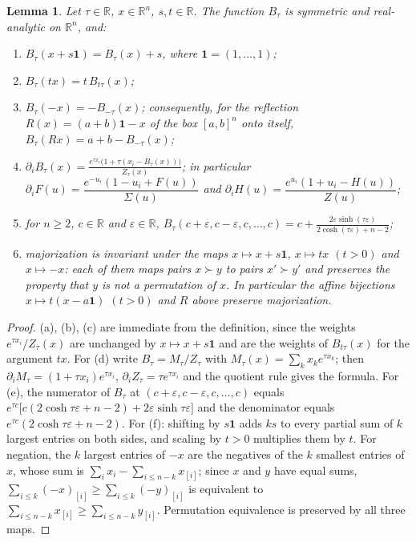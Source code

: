 \documentclass[11pt,a4paper]{article}
\theoremstyle{plain}
\newtheorem{lemma}[theorem]{Lemma}
\theoremstyle{definition}
\newcommand{\R}{\mathbb{R}}
\newcommand{\one}{\mathbf{1}}
\newcommand{\maj}{\succ}
\begin{document}
\begin{lemma}\label{lem:basic}
Let $\tau\in\R$, $x\in\R^n$, $s,t\in\R$. The function $B_\tau$ is symmetric and real-analytic on $\R^n$, and:
\begin{enumerate}
\item[(a)] $B_\tau(x+s\one)=B_\tau(x)+s$, where $\one=(1,\dots,1)$;
\item[(b)] $B_\tau(tx)=t\,B_{t\tau}(x)$;
\item[(c)] $B_\tau(-x)=-B_{-\tau}(x)$; consequently, for the reflection $R(x)=(a+b)\one-x$ of the box $[a,b]^n$ onto itself, $B_\tau(Rx)=a+b-B_{-\tau}(x)$;
\item[(d)] $\displaystyle \partial_i B_\tau(x)=\frac{e^{\tau x_i}\bigl(1+\tau(x_i-B_\tau(x))\bigr)}{Z_\tau(x)}$; in particular $\partial_i F(u)=\dfrac{e^{-u_i}(1-u_i+F(u))}{\Sigma(u)}$ and $\partial_i H(u)=\dfrac{e^{u_i}(1+u_i-H(u))}{Z(u)}$;
\item[(e)] for $n\ge 2$, $c\in\R$ and $\varepsilon\in\R$,
$\displaystyle B_\tau(c+\varepsilon,c-\varepsilon,c,\dots,c)=c+\frac{2\varepsilon\sinh(\tau\varepsilon)}{2\cosh(\tau\varepsilon)+n-2}$;
\item[(f)] majorization is invariant under the maps $x\mapsto x+s\one$, $x\mapsto tx$ $(t>0)$ and $x\mapsto -x$: each of them maps pairs $x\maj y$ to pairs $x'\maj y'$ and preserves the property that $y$ is not a permutation of $x$. In particular the affine bijections $x\mapsto t(x-a\one)$ $(t>0)$ and $R$ above preserve majorization.
\end{enumerate}
\end{lemma}

\begin{proof}
(a), (b), (c) are immediate from the definition, since the weights $e^{\tau x_i}/Z_\tau(x)$ are unchanged by $x\mapsto x+s\one$ and are the weights of $B_{t\tau}(x)$ for the argument $tx$. For (d) write $B_\tau=M_\tau/Z_\tau$ with $M_\tau(x)=\sum_k x_k e^{\tau x_k}$; then $\partial_i M_\tau=(1+\tau x_i)e^{\tau x_i}$, $\partial_i Z_\tau=\tau e^{\tau x_i}$ and the quotient rule gives the formula. For (e), the numerator of $B_\tau$ at $(c+\varepsilon,c-\varepsilon,c,\dots,c)$ equals $e^{\tau c}\bigl[c(2\cosh\tau\varepsilon+n-2)+2\varepsilon\sinh\tau\varepsilon\bigr]$ and the denominator equals $e^{\tau c}(2\cosh\tau\varepsilon+n-2)$. For (f): shifting by $s\one$ adds $ks$ to every partial sum of $k$ largest entries on both sides, and scaling by $t>0$ multiplies them by $t$. For negation, the $k$ largest entries of $-x$ are the negatives of the $k$ smallest entries of $x$, whose sum is $\sum_i x_i-\sum_{i\le n-k}x_{[i]}$; since $x$ and $y$ have equal sums, $\sum_{i\le k}(-x)_{[i]}\ge\sum_{i\le k}(-y)_{[i]}$ is equivalent to $\sum_{i\le n-k}x_{[i]}\ge\sum_{i\le n-k}y_{[i]}$. Permutation equivalence is preserved by all three maps.
\end{proof}
\end{document}

